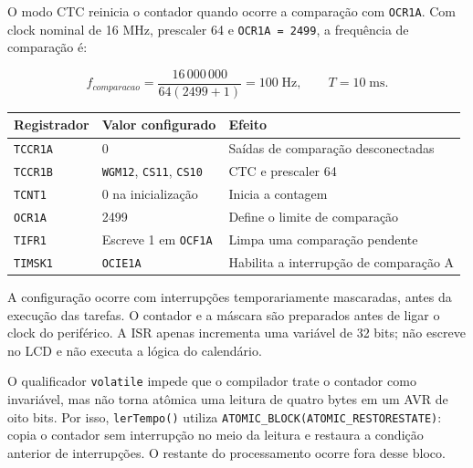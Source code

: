O modo CTC reinicia o contador quando ocorre a comparação com \texttt{OCR1A}. Com clock nominal de 16 MHz, prescaler 64 e \texttt{OCR1A = 2499}, a frequência de comparação é:

\[f_{comparacao}=\frac{16\,000\,000}{64(2499+1)}=100\;\mathrm{Hz},\qquad T=10\;\mathrm{ms}.\]

\begin{center}\small
\begin{tabularx}{\textwidth}{@{}YYY@{}}\toprule

\textbf{Registrador} & \textbf{Valor configurado} & \textbf{Efeito} \\ \midrule

\texttt{TCCR1A} & 0 & Saídas de comparação desconectadas \\

\texttt{TCCR1B} & \texttt{WGM12}, \texttt{CS11}, \texttt{CS10} & CTC e prescaler 64 \\

\texttt{TCNT1} & 0 na inicialização & Inicia a contagem \\

\texttt{OCR1A} & 2499 & Define o limite de comparação \\

\texttt{TIFR1} & Escreve 1 em \texttt{OCF1A} & Limpa uma comparação pendente \\

\texttt{TIMSK1} & \texttt{OCIE1A} & Habilita a interrupção de comparação A \\

\bottomrule\end{tabularx}
\end{center}

A configuração ocorre com interrupções temporariamente mascaradas, antes da execução das tarefas. O contador e a máscara são preparados antes de ligar o clock do periférico. A ISR apenas incrementa uma variável de 32 bits; não escreve no LCD e não executa a lógica do calendário. \autocite{fonte5}



O qualificador \texttt{volatile} impede que o compilador trate o contador como invariável, mas não torna atômica uma leitura de quatro bytes em um AVR de oito bits. Por isso, \texttt{lerTempo()} utiliza \texttt{ATOMIC\_BLOCK(ATOMIC\_RESTORESTATE)}: copia o contador sem interrupção no meio da leitura e restaura a condição anterior de interrupções. O restante do processamento ocorre fora desse bloco. \autocite{fonte6}

